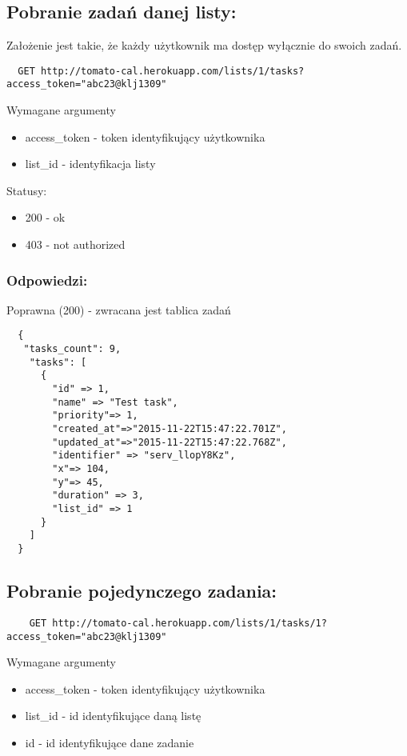 \subsection{Pobranie zadań danej listy:}

Założenie jest takie, że każdy użytkownik ma dostęp wyłącznie do swoich zadań.


\begin{lstlisting}
  GET http://tomato-cal.herokuapp.com/lists/1/tasks?access_token="abc23@klj1309"
\end{lstlisting}


Wymagane argumenty
\begin{itemize}
  \item access\_token - token identyfikujący użytkownika
  \item list\_id - identyfikacja listy
\end{itemize}

Statusy:
\begin{itemize}
  \item 200 - ok
  \item 403 - not authorized
\end{itemize}

\subsubsection{Odpowiedzi:}

Poprawna (200) - zwracana jest tablica zadań

\begin{lstlisting}
  {
   "tasks_count": 9,
    "tasks": [
      {
        "id" => 1,
        "name" => "Test task",
        "priority"=> 1,
        "created_at"=>"2015-11-22T15:47:22.701Z",
        "updated_at"=>"2015-11-22T15:47:22.768Z",
        "identifier" => "serv_llopY8Kz",
        "x"=> 104,
        "y"=> 45,
        "duration" => 3,
        "list_id" => 1
      }
    ]
  }
\end{lstlisting}

\subsection{Pobranie pojedynczego zadania:}

\begin{lstlisting}
    GET http://tomato-cal.herokuapp.com/lists/1/tasks/1?access_token="abc23@klj1309"
\end{lstlisting}

Wymagane argumenty
\begin{itemize}
  \item access\_token - token identyfikujący użytkownika
  \item list\_id - id identyfikujące daną listę
  \item id - id identyfikujące dane zadanie
\end{itemize}

